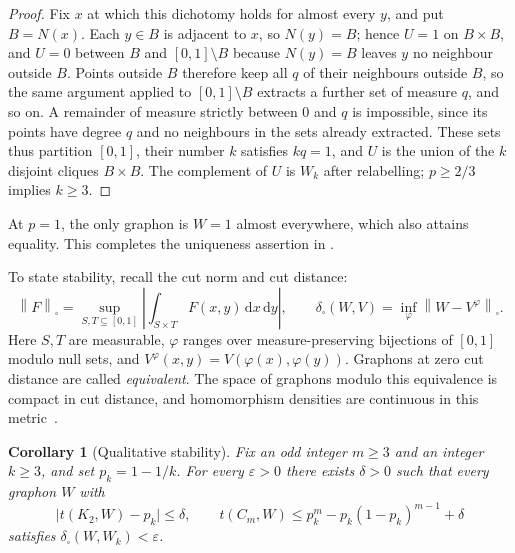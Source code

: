 \documentclass[11pt]{article}
\newtheorem{corollary}[theorem]{Corollary}
\numberwithin{equation}{section}
\newcommand{\norm}[1]{\left\lVert #1\right\rVert}
\newcommand{\dd}{\,\mathrm d}
\newcommand{\tC}[2]{t(C_{#1},#2)}
\newcommand{\edens}[1]{t(K_{2},#1)}
\newcommand{\ddxy}{\dd x\dd y}
\begin{document}
\begin{proof}
  Fix $x$ at which this dichotomy holds for almost every $y$, and put $B=N(x)$.
  Each $y\in B$ is adjacent to $x$, so $N(y)=B$; hence $U=1$ on $B\times B$, and $U=0$ between $B$ and $[0,1]\setminus B$ because $N(y)=B$ leaves $y$ no neighbour outside $B$.
  Points outside $B$ therefore keep all $q$ of their neighbours outside $B$, so the same argument applied to $[0,1]\setminus B$ extracts a further set of measure $q$, and so on.
  A remainder of measure strictly between $0$ and $q$ is impossible, since its points have degree $q$ and no neighbours in the sets already extracted.
  These sets thus partition $[0,1]$, their number $k$ satisfies $kq=1$, and $U$ is the union of the $k$ disjoint cliques $B\times B$.
  The complement of $U$ is $W_k$ after relabelling; $p\ge2/3$ implies $k\ge3$.
\end{proof}

At $p=1$, the only graphon is $W=1$ almost everywhere, which also attains equality.
This completes the uniqueness assertion in .

To state stability, recall the cut norm and cut distance:
\[
  \norm F_\square=\sup_{S,T\subseteq[0,1]}
    \left|\int_{S\times T}F(x,y)\ddxy\right|,
  \qquad
  \delta_\square(W,V)=\inf_\varphi\norm{W-V^\varphi}_\square.
\]
Here $S,T$ are measurable, $\varphi$ ranges over measure-preserving bijections of $[0,1]$ modulo null sets, and $V^\varphi(x,y)=V(\varphi(x),\varphi(y))$.
Graphons at zero cut distance are called \emph{equivalent}.
The space of graphons modulo this equivalence is compact in cut distance, and homomorphism densities are continuous in this metric~\cite{borgs2008convergent,lovasz2012large}.

\begin{corollary}[Qualitative stability]\label{cor:stability}
  Fix an odd integer $m\ge3$ and an integer $k\ge3$, and set $p_k=1-1/k$.
  For every $\varepsilon>0$ there exists $\delta>0$ such that every graphon $W$ with
  \[
    \bigl|\edens W-p_k\bigr|\le\delta,
    \qquad
    \tC mW\le p_k^m-p_k(1-p_k)^{m-1}+\delta
  \]
  satisfies $\delta_\square(W,W_k)<\varepsilon$.
\end{corollary}
\end{document}

